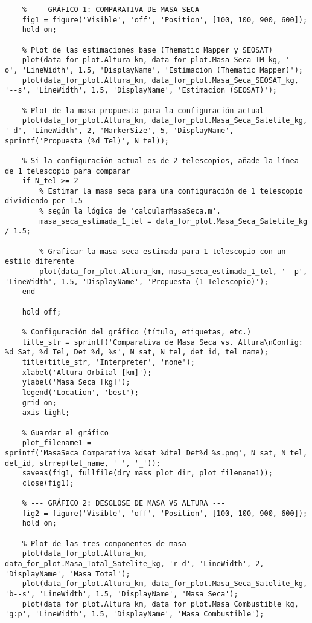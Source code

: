 \begin{verbatim}
    % --- GRÁFICO 1: COMPARATIVA DE MASA SECA ---
    fig1 = figure('Visible', 'off', 'Position', [100, 100, 900, 600]);
    hold on;

    % Plot de las estimaciones base (Thematic Mapper y SEOSAT)
    plot(data_for_plot.Altura_km, data_for_plot.Masa_Seca_TM_kg, '--o', 'LineWidth', 1.5, 'DisplayName', 'Estimacion (Thematic Mapper)');
    plot(data_for_plot.Altura_km, data_for_plot.Masa_Seca_SEOSAT_kg, '--s', 'LineWidth', 1.5, 'DisplayName', 'Estimacion (SEOSAT)');
    
    % Plot de la masa propuesta para la configuración actual
    plot(data_for_plot.Altura_km, data_for_plot.Masa_Seca_Satelite_kg, '-d', 'LineWidth', 2, 'MarkerSize', 5, 'DisplayName', sprintf('Propuesta (%d Tel)', N_tel));
    
    % Si la configuración actual es de 2 telescopios, añade la línea de 1 telescopio para comparar
    if N_tel >= 2
        % Estimar la masa seca para una configuración de 1 telescopio dividiendo por 1.5
        % según la lógica de 'calcularMasaSeca.m'.
        masa_seca_estimada_1_tel = data_for_plot.Masa_Seca_Satelite_kg / 1.5;
    
        % Graficar la masa seca estimada para 1 telescopio con un estilo diferente
        plot(data_for_plot.Altura_km, masa_seca_estimada_1_tel, '--p', 'LineWidth', 1.5, 'DisplayName', 'Propuesta (1 Telescopio)');
    end
    
    hold off;
    
    % Configuración del gráfico (título, etiquetas, etc.)
    title_str = sprintf('Comparativa de Masa Seca vs. Altura\nConfig: %d Sat, %d Tel, Det %d, %s', N_sat, N_tel, det_id, tel_name);
    title(title_str, 'Interpreter', 'none');
    xlabel('Altura Orbital [km]');
    ylabel('Masa Seca [kg]');
    legend('Location', 'best');
    grid on;
    axis tight;
    
    % Guardar el gráfico
    plot_filename1 = sprintf('MasaSeca_Comparativa_%dsat_%dtel_Det%d_%s.png', N_sat, N_tel, det_id, strrep(tel_name, ' ', '_'));
    saveas(fig1, fullfile(dry_mass_plot_dir, plot_filename1));
    close(fig1);

    % --- GRÁFICO 2: DESGLOSE DE MASA VS ALTURA ---
    fig2 = figure('Visible', 'off', 'Position', [100, 100, 900, 600]);
    hold on;

    % Plot de las tres componentes de masa
    plot(data_for_plot.Altura_km, data_for_plot.Masa_Total_Satelite_kg, 'r-d', 'LineWidth', 2, 'DisplayName', 'Masa Total');
    plot(data_for_plot.Altura_km, data_for_plot.Masa_Seca_Satelite_kg, 'b--s', 'LineWidth', 1.5, 'DisplayName', 'Masa Seca');
    plot(data_for_plot.Altura_km, data_for_plot.Masa_Combustible_kg, 'g:p', 'LineWidth', 1.5, 'DisplayName', 'Masa Combustible');
    

\end{verbatim}
